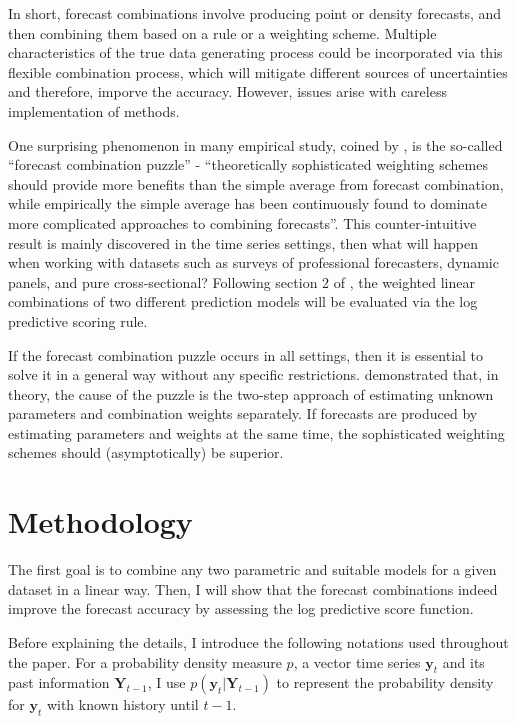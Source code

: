 \documentclass{monashthesis}
\begin{document}
In short, forecast combinations involve producing point or density forecasts, and then combining them based on a rule or a weighting scheme. Multiple characteristics of the true data generating process could be incorporated via this flexible combination process, which will mitigate different sources of uncertainties and therefore, imporve the accuracy. However, issues arise with careless implementation of methods.

One surprising phenomenon in many empirical study, coined by \textcite{SW04}, is the so-called ``forecast combination puzzle'' - ``theoretically sophisticated weighting schemes should provide more benefits than the simple average from forecast combination, while empirically the simple average has been continuously found to dominate more complicated approaches to combining forecasts''. This counter-intuitive result is mainly discovered in the time series settings, then what will happen when working with datasets such as surveys of professional forecasters, dynamic panels, and pure cross-sectional? Following section 2 of \textcite{GA11}, the weighted linear combinations of two different prediction models will be evaluated via the log predictive scoring rule.

If the forecast combination puzzle occurs in all settings, then it is essential to solve it in a general way without any specific restrictions. \textcite{FZMP23} demonstrated that, in theory, the cause of the puzzle is the two-step approach of estimating unknown parameters and combination weights separately. If forecasts are produced by estimating parameters and weights at the same time, the sophisticated weighting schemes should (asymptotically) be superior.

\hypertarget{methodology}{%
\chapter{Methodology}\label{methodology}}

The first goal is to combine any two parametric and suitable models for a given dataset in a linear way. Then, I will show that the forecast combinations indeed improve the forecast accuracy by assessing the log predictive score function.

Before explaining the details, I introduce the following notations used throughout the paper. For a probability density measure \(p\), a vector time series \(\pmb{y}_t\) and its past information \(\pmb{Y}_{t-1}\), I use \(p(\pmb{y}_t|\pmb{Y}_{t-1})\) to represent the probability density for \(\pmb{y}_t\) with known history until \(t-1\).
\end{document}

